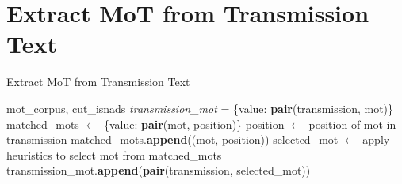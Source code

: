 \documentclass[12pt,english]{article}
\newcommand{\myindent}[1]{
\newline\makebox[#1cm]{}
}
\begin{document}
\newpage
\section{Extract MoT from Transmission Text} %
\begin{center}
\begin{minipage}{.8\linewidth}
\begin{algorithm}[H]
\caption{Extract MoT from Transmission Text}\label{euclid}
\begin{algorithmic}[1]
\Require mot\_corpus, cut\_isnads
\State \textit{transmission\_mot} = \{value: \textbf{pair}(transmission, mot)\}
    \State matched\_mots $\gets$ \{value: \textbf{pair}(mot, position)\}
            \State position $\gets$ position of mot in transmission
            \State matched\_mots.\textbf{append}((mot, position))
        \EndIf 
    \EndForeach
    \State selected\_mot $\gets$ apply heuristics to select mot from \myindent{3.35} matched\_mots
    \State transmission\_mot.\textbf{append}(\textbf{pair}(transmission, \myindent{6.25} selected\_mot))
\EndForeach

\end{algorithmic}
\end{algorithm}
\end{minipage}
\end{center}

\newpage
\end{document}
